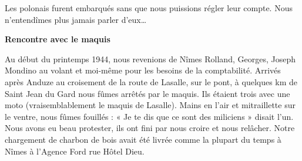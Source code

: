 \vspace{0.45cm}

Les polonais furent embarqués sans que nous puissions régler leur compte. Nous
n’entendîmes plus jamais parler d’eux…

\vspace{0.55cm}

\textbf{Rencontre avec le maquis}

\vspace{0.35cm}

Au début du printemps 1944, nous revenions de Nîmes Rolland, Georges, Joseph Mondino au
volant et moi-même pour les besoins de la comptabilité. Arrivés après Anduze au croisement
de la route de Lasalle, sur le pont, à quelques km de Saint Jean du Gard nous fûmes arrêtés
par le maquis. Ils étaient trois avec une moto (vraisemblablement le maquis de Lasalle).
Mains en l’air et mitraillette sur le ventre, nous fûmes fouillés : « Je te dis que ce sont des
miliciens » disait l’un. Nous avons eu beau protester, ils ont fini par nous croire et nous
relâcher. Notre chargement de charbon de bois avait été livrée comme la plupart du temps à
Nîmes à l’Agence Ford rue Hôtel Dieu. 
